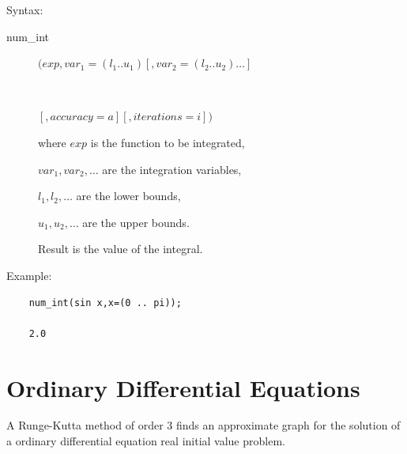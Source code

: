 Syntax:

\begin{description}
\item[num\_int] $(exp,var_1=(l_1 .. u_1)[,var_2=(l_2 .. u_2)\ldots]$
\item[\ \ \ \ \ \ ]$[,accuracy=a][,iterations=i])$

where $exp$ is the function to be integrated,

$var_1, var_2 , \ldots$ are the integration variables,

$l_1, l_2 , \ldots$ are the lower bounds,

$u_1, u_2 , \ldots$ are the upper bounds.

Result is the value of the integral.

\end{description}

Example:

\begin{verbatim}
    num_int(sin x,x=(0 .. pi));

    2.0
\end{verbatim}

\section{Ordinary Differential Equations}
\hypertarget{operator:NUM_ODESOLVE}{}

A Runge-Kutta method of order 3 finds an approximate graph for
the solution of a ordinary differential equation
real initial value problem.

